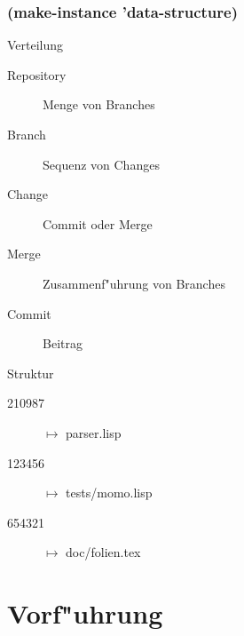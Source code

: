 \documentclass[german, presentation]{beamer}
\begin{document}
\begin{frame}
 \frametitle{(make-instance 'data-structure)}
 
 \begin{block}{Verteilung} 
   \begin{description}
   \item[Repository] Menge von Branches
   \item[Branch] Sequenz von Changes
   \item[Change] Commit oder Merge
   \item[Merge] Zusammenf"uhrung von Branches
   \item[Commit] Beitrag
   \end{description}
 \end{block}

 \begin{block}{Struktur} 
   \begin{description}
   \item[210987] $\mapsto$ parser.lisp
   \item[123456] $\mapsto$ tests/momo.lisp
   \item[654321]  $\mapsto$ doc/folien.tex
   \end{description}
 \end{block}

\end{frame}

\section{Vorf"uhrung} 
\begin{frame}
  
\end{frame}
\end{document}
